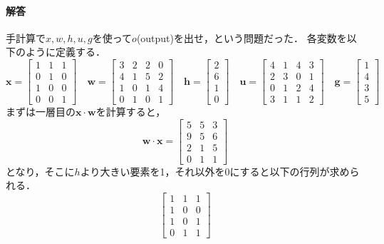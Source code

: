 \documentclass[11pt, a4paper]{jsarticle}
\begin{document}
  \paragraph{ 解答}
  手計算で$ x,w,h,u,g $を使って$ o $(output)を出せ，という問題だった．
  各変数を以下のように定義する．
  \begin{equation*}
    {\bm x} = \begin{bmatrix}1&1&1\\0&1&0\\1&0&0\\0&0&1\end{bmatrix} \quad
    {\bm w} = \begin{bmatrix}3&2&2&0\\4&1&5&2\\1&0&1&4\\0&1&0&1\end{bmatrix} \quad
    {\bm h} = \begin{bmatrix}2\\6\\1\\0\end{bmatrix} \quad
    {\bm u} = \begin{bmatrix}4&1&4&3\\2&3&0&1\\0&1&2&4\\3&1&1&2\end{bmatrix} \quad
    {\bm g} = \begin{bmatrix}1\\4\\3\\5\end{bmatrix}
  \end{equation*}
  まずは一層目の$ {\bm x} \cdot {\bm w} $を計算すると，
  \begin{equation*}
    {\bm w} \cdot {\bm x} = \begin{bmatrix}5&5&3\\9&5&6\\2&1&5\\0&1&1\end{bmatrix}
  \end{equation*}
  となり，そこに$ h $より大きい要素を1，それ以外を0にすると以下の行列が求められる．
  \begin{equation*}
    \begin{bmatrix}1&1&1\\1&0&0\\1&0&1\\0&1&1\end{bmatrix}
  \end{equation*}
\end{document}
